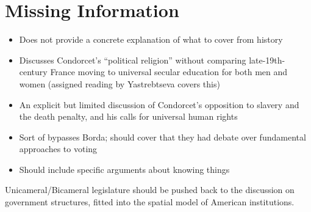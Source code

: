 \section{Missing Information}

\begin{itemize}
    \item Does not provide a concrete explanation of what to cover from history

    \item Discusses Condorcet's ``political religion'' without comparing late-19th-century France moving to universal secular education for both men and women (assigned reading by Yastrebtseva covers this)

    \item An explicit but limited discussion of Condorcet's opposition to slavery and the death penalty, and his calls for universal human rights

    \item Sort of bypasses Borda; should cover that they had debate over fundamental approaches to voting

    \item Should  include specific arguments about knowing things
\end{itemize}

Unicameral/Bicameral legislature should be pushed back to the discussion on government structures, fitted into the spatial model of American institutions.

